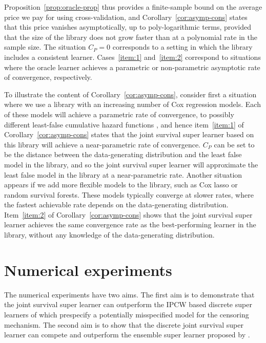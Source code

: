 \documentclass[lineno]{biometrika}
\newcommand{\1}{\mathds{1}}
\begin{document}
Proposition~\ref{prop:oracle-prop} thus provides a finite-sample bound
on the average price we pay for using cross-validation, and
Corollary~\ref{cor:asymp-cons} states that this price vanishes
asymptotically, up to poly-logarithmic terms, provided that the size
of the library does not grow faster than at a polynomial rate in the
sample size. The situation \( C_P=0 \) corresponds to a setting in
which the library includes a consistent learner. Cases~\ref{item:1}
and~\ref{item:2} correspond to situations where the oracle learner
achieves a parametric or non-parametric asymptotic rate of
convergence, respectively.

To illustrate the content of Corollary~\ref{cor:asymp-cons}, consider
first a situation where we use a library with an increasing number of
Cox regression models. Each of these models will achieve a parametric
rate of convergence, to possibly different least-false cumulative
hazard functions \cite{hjort1992inference}, and hence
item~\ref{item:1} of Corollary~\ref{cor:asymp-cons} states that the
joint survival super learner based on this library will achieve a
near-parametric rate of convergence.  \( C_P \) can be set to be the
distance between the data-generating distribution and the least false
model in the library, and so the joint survival super learner will
approximate the least false model in the library at a near-parametric
rate. Another situation appears if we add more flexible models to the
library, such as Cox lasso or random survival forests.  These models
typically converge at slower rates, where the fastest achievable rate
depends on the data-generating distribution.  Item~\ref{item:2} of
Corollary~\ref{cor:asymp-cons} shows that the joint survival super
learner achieves the same convergence rate as the best-performing
learner in the library, without any knowledge of the data-generating
distribution.

\section{Numerical experiments}
\label{sec:numer-exper}

The numerical experiments have two aims. The first aim is to
demonstrate that the joint survival super learner can outperform the
IPCW based discrete super learners of \citep{gonzalez2021stacked}
which prespecify a potentially misspecified model for the censoring
mechanism. The second aim is to show that the discrete joint survival
super learner can compete and outperform the ensemble super learner
proposed by \cite{westling2021inference}.
\end{document}
